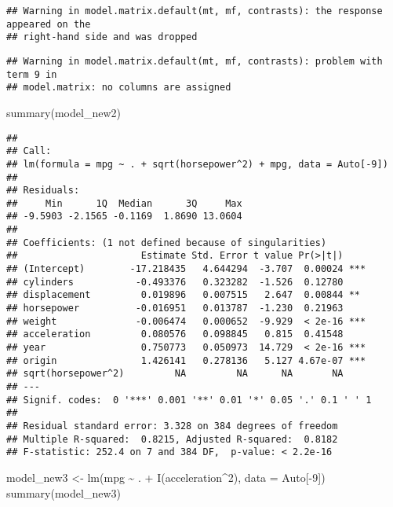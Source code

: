 \documentclass[
]{article}
\newenvironment{Shaded}{\begin{snugshade}}{\end{snugshade}}
\newcommand{\AttributeTok}[1]{\textcolor[rgb]{0.77,0.63,0.00}{#1}}
\newcommand{\DecValTok}[1]{\textcolor[rgb]{0.00,0.00,0.81}{#1}}
\newcommand{\FunctionTok}[1]{\textcolor[rgb]{0.00,0.00,0.00}{#1}}
\newcommand{\NormalTok}[1]{#1}
\newcommand{\OtherTok}[1]{\textcolor[rgb]{0.56,0.35,0.01}{#1}}
\newcommand{\SpecialCharTok}[1]{\textcolor[rgb]{0.00,0.00,0.00}{#1}}
\begin{document}
\begin{verbatim}
## Warning in model.matrix.default(mt, mf, contrasts): the response appeared on the
## right-hand side and was dropped
\end{verbatim}

\begin{verbatim}
## Warning in model.matrix.default(mt, mf, contrasts): problem with term 9 in
## model.matrix: no columns are assigned
\end{verbatim}

\begin{Shaded}
\begin{Highlighting}[]
\FunctionTok{summary}\NormalTok{(model\_new2)}
\end{Highlighting}
\end{Shaded}

\begin{verbatim}
## 
## Call:
## lm(formula = mpg ~ . + sqrt(horsepower^2) + mpg, data = Auto[-9])
## 
## Residuals:
##     Min      1Q  Median      3Q     Max 
## -9.5903 -2.1565 -0.1169  1.8690 13.0604 
## 
## Coefficients: (1 not defined because of singularities)
##                      Estimate Std. Error t value Pr(>|t|)    
## (Intercept)        -17.218435   4.644294  -3.707  0.00024 ***
## cylinders           -0.493376   0.323282  -1.526  0.12780    
## displacement         0.019896   0.007515   2.647  0.00844 ** 
## horsepower          -0.016951   0.013787  -1.230  0.21963    
## weight              -0.006474   0.000652  -9.929  < 2e-16 ***
## acceleration         0.080576   0.098845   0.815  0.41548    
## year                 0.750773   0.050973  14.729  < 2e-16 ***
## origin               1.426141   0.278136   5.127 4.67e-07 ***
## sqrt(horsepower^2)         NA         NA      NA       NA    
## ---
## Signif. codes:  0 '***' 0.001 '**' 0.01 '*' 0.05 '.' 0.1 ' ' 1
## 
## Residual standard error: 3.328 on 384 degrees of freedom
## Multiple R-squared:  0.8215, Adjusted R-squared:  0.8182 
## F-statistic: 252.4 on 7 and 384 DF,  p-value: < 2.2e-16
\end{verbatim}

\begin{Shaded}
\begin{Highlighting}[]
\NormalTok{model\_new3 }\OtherTok{\textless{}{-}} \FunctionTok{lm}\NormalTok{(mpg }\SpecialCharTok{\textasciitilde{}}\NormalTok{ . }\SpecialCharTok{+} \FunctionTok{I}\NormalTok{(acceleration}\SpecialCharTok{\^{}}\DecValTok{2}\NormalTok{), }\AttributeTok{data =}\NormalTok{ Auto[}\SpecialCharTok{{-}}\DecValTok{9}\NormalTok{])}
\FunctionTok{summary}\NormalTok{(model\_new3)}
\end{Highlighting}
\end{Shaded}
\end{document}
